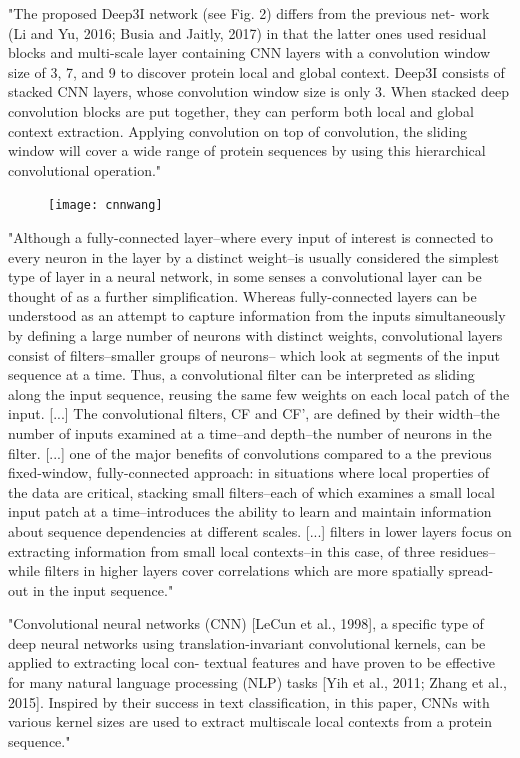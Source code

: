 	"The proposed Deep3I network (see Fig. 2) differs from the previous net- work (Li and Yu, 2016; Busia and Jaitly, 2017) in that the latter ones used residual blocks and multi-scale layer containing CNN layers with a convolution window size of 3, 7, and 9 to discover protein local and global context. Deep3I consists of stacked CNN layers, whose convolution window size is only 3. When stacked deep convolution blocks are put together, they can perform both local and global context extraction. Applying convolution on top of convolution, the sliding window will cover a wide range of protein sequences by using this hierarchical convolutional operation." \cite{Fang2017}
	\begin{figure}[h]
		\centering
		\texttt{[image: cnnwang]}
	\end{figure}
	
	"Although a fully-connected layer–where every input of interest is connected to every neuron in the layer by a distinct weight–is usually considered the simplest type of layer in a neural network, in some senses a convolutional layer can be thought of as a further simplification. Whereas fully-connected layers can be understood as an attempt to capture information from the inputs simultaneously by defining a large number of neurons with distinct weights, convolutional layers consist of filters–smaller groups of neurons– which look at segments of the input sequence at a time. Thus, a convolutional filter can be interpreted as sliding along the input sequence, reusing the same few weights on each local patch of the input. [...] The convolutional filters, CF and CF’, are defined by their width–the number of inputs examined at a time–and depth–the number of neurons in the filter. [...] one of the major benefits of convolutions compared to a the previous fixed-window, fully-connected approach: in situations where local properties of the data are critical, stacking small filters–each of which examines a small local input patch at a time–introduces the ability to learn and maintain information about sequence dependencies at different scales. [...] filters in lower layers focus on extracting information from small local contexts–in this case, of three residues–while filters in higher layers cover correlations which are more spatially spread-out in the input sequence." \cite{Busia2017}
	
	"Convolutional neural networks (CNN) [LeCun et al., 1998], a specific type of deep neural networks using translation-invariant convolutional kernels, can be applied to extracting local con- textual features and have proven to be effective for many natural language processing (NLP) tasks [Yih et al., 2011; Zhang et al., 2015]. Inspired by their success in text classification, in this paper, CNNs with various kernel sizes are used to extract multiscale local contexts from a protein sequence." \cite{Li2016}
	
